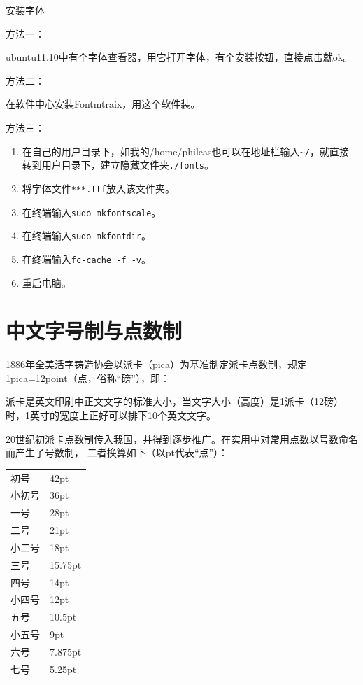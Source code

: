 {安装字体

方法一：

ubuntu11.10中有个字体查看器，用它打开字体，有个安装按钮，直接点击就ok。

方法二：

在软件中心安装Fontmtraix，用这个软件装。

方法三：
\begin{enumerate}
\item 在自己的用户目录下，如我的/home/phileas也可以在地址栏输入\verb|~/|，就直接转到用户目录下，建立隐藏文件夹\verb|./fonts|。
\item 将字体文件\verb|***.ttf|放入该文件夹。
\item 在终端输入\verb|sudo mkfontscale|。
\item 在终端输入\verb|sudo mkfontdir|。
\item 在终端输入\verb|fc-cache -f -v|。
\item 重启电脑。
\end{enumerate}



\section{中文字号制与点数制}
1886年全美活字铸造协会以派卡（pica）为基准制定派卡点数制，规定1pica=12point（点，俗称“磅”），即：
\begin{center}
\end{center}
\begin{center}
\end{center}



派卡是英文印刷中正文文字的标准大小，当文字大小（高度）是1派卡（12磅）时，1英寸的宽度上正好可以排下10个英文文字。

20世纪初派卡点数制传入我国，并得到逐步推广。在实用中对常用点数以号数命名而产生了号数制，
 二者换算如下（以pt代表“点”）：
 \begin{center}
 \begin{tabular}{l@{ = }l}
初号& 42pt\\
小初号& 36pt\\
 一号& 28pt\\
 二号& 21pt\\
小二号& 18pt\\
三号& 15.75pt\\
四号& 14pt\\
小四号& 12pt\\
五号& 10.5pt\\
小五号& 9pt\\
六号 & 7.875pt\\
七号 & 5.25pt
\end{tabular}
\end{center}




}
